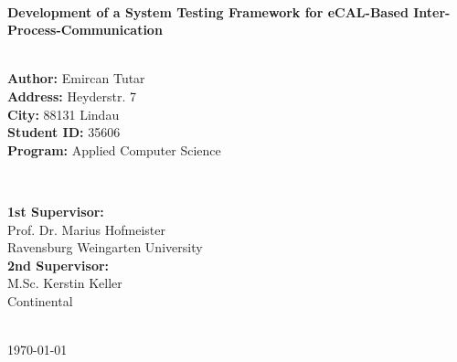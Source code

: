 \documentclass[a4paper,12pt,singlespacing]{article}
\begin{document}
\begin{titlepage}
	
	\HRule \\[0.4cm]
	{ \huge \bfseries Development of a System Testing Framework for eCAL-Based Inter-Process-Communication}\\[0.4cm] %
	\HRule \\[1.5cm]
	
	
	\begin{minipage}{0.5\textwidth}
		\begin{flushleft}\fontsize{11pt}{14pt}\selectfont
		\textbf{Author:} Emircan Tutar\\[4pt]
		\textbf{Address:} Heyderstr. 7\\[4pt]
		\textbf{City:} 88131 Lindau\\[7pt]
		\textbf{Student ID:} 35606\\[4pt]
		\textbf{Program:} Applied Computer Science\\[4pt]
		\end{flushleft}
	\end{minipage}
	~
	\begin{minipage}{0.45\textwidth}
		\begin{flushleft} \fontsize{11pt}{14pt}\selectfont
		\textbf{1st Supervisor:} \\[2pt]
		Prof. Dr. Marius Hofmeister \\
		Ravensburg Weingarten University \\[10pt]
		\textbf{2nd Supervisor:} \\[2pt]
		M.Sc. Kerstin Keller \\
		Continental\\[7pt]
		\end{flushleft}
	\end{minipage}\\[3cm]
	
	
	{\large \today}\\[0cm] %
	
	\vfill %
	
\end{titlepage}
\end{document}
